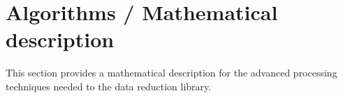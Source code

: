 \clearpage

\section{Algorithms / Mathematical description}

This section provides a mathematical description for the advanced processing techniques needed to the data reduction library.
\label{sec:algorithms}




